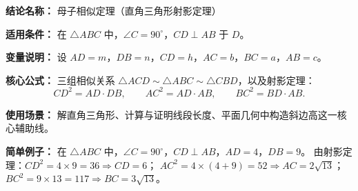 \textbf{结论名称：} 母子相似定理（直角三角形射影定理）

\textbf{适用条件：} 在 $\triangle ABC$ 中，$\angle C=90^\circ$，$CD\perp AB$ 于 $D$。

\textbf{变量说明：} 设 $AD=m$，$DB=n$，$CD=h$，$AC=b$，$BC=a$，$AB=c$。

\textbf{核心公式：} 三组相似关系 $\triangle ACD\sim\triangle ABC\sim\triangle CBD$，以及射影定理：
\[
\boxed{CD^{2}=AD\cdot DB},\qquad
\boxed{AC^{2}=AD\cdot AB},\qquad
\boxed{BC^{2}=BD\cdot AB}.
\]

\textbf{使用场景：} 解直角三角形、计算与证明线段长度、平面几何中构造斜边高这一核心辅助线。

\textbf{简单例子：} 在 $\triangle ABC$ 中，$\angle C=90^\circ$，$CD\perp AB$，$AD=4$，$DB=9$。
由射影定理：$CD^{2}=4\times 9=36\Rightarrow CD=6$；
$AC^{2}=4\times(4+9)=52\Rightarrow AC=2\sqrt{13}$；
$BC^{2}=9\times 13=117\Rightarrow BC=3\sqrt{13}$。